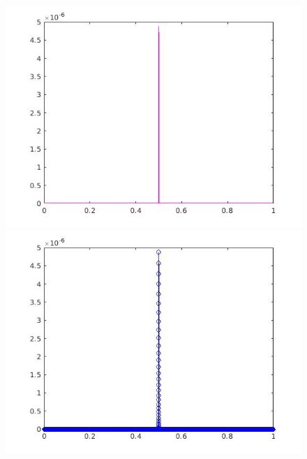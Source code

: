 \documentclass[a4paper,11pt]{article}
\begin{document}
\begin{figure}[!hp]
\centering
\begin{minipage}{.5\textwidth}
  \centering
  \includegraphics[width=1\linewidth]{images/lab2_36.jpg}
\end{minipage}%
\begin{minipage}{.5\textwidth}
  \centering
  \includegraphics[width=1\linewidth]{images/lab2_37.jpg}
\end{minipage}
\end{figure}

\newpage
\end{document}
